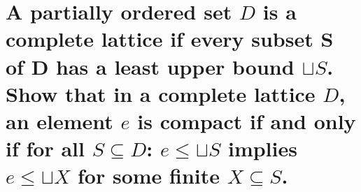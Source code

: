 \section{A partially ordered set $D$ is a complete lattice if every subset S of D has a least upper bound $\sqcup S$. Show that in a complete lattice $D$, an element $e$ is compact if and only if for all $S \subseteq D$: $e \leq \sqcup S$ implies $e \leq \sqcup X$ for some finite $X \subseteq S$.}
